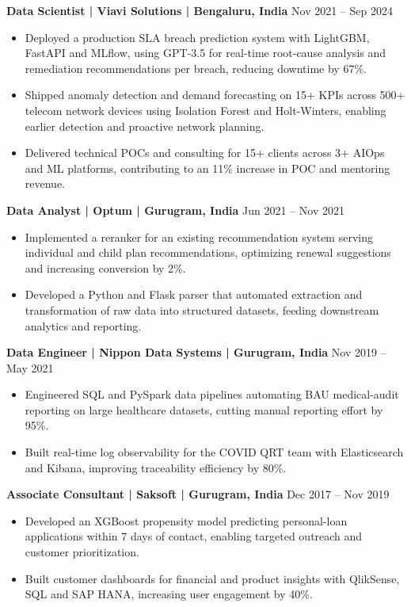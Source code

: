 \documentclass[10pt,a4paper]{article}
\newcommand{\role}[2]{\textbf{#1} \hfill #2\par}
\begin{document}
\role{Data Scientist | Viavi Solutions | Bengaluru, India}{Nov 2021 -- Sep 2024}
\begin{itemize}
  \item Deployed a production SLA breach prediction system with LightGBM, FastAPI and MLflow, using GPT-3.5 for
  real-time root-cause analysis and remediation recommendations per breach, reducing downtime by 67\%.
  \item Shipped anomaly detection and demand forecasting on 15+ KPIs across 500+ telecom network devices using
  Isolation Forest and Holt-Winters, enabling earlier detection and proactive network planning.
  \item Delivered technical POCs and consulting for 15+ clients across 3+ AIOps and ML platforms, contributing to an
  11\% increase in POC and mentoring revenue.
\end{itemize}
\vspace{3pt}

\role{Data Analyst | Optum | Gurugram, India}{Jun 2021 -- Nov 2021}
\begin{itemize}
  \item Implemented a reranker for an existing recommendation system serving individual and child plan
  recommendations, optimizing renewal suggestions and increasing conversion by 2\%.
  \item Developed a Python and Flask parser that automated extraction and transformation of raw data into structured
  datasets, feeding downstream analytics and reporting.
\end{itemize}
\vspace{3pt}

\role{Data Engineer | Nippon Data Systems | Gurugram, India}{Nov 2019 -- May 2021}
\begin{itemize}
  \item Engineered SQL and PySpark data pipelines automating BAU medical-audit reporting on large healthcare datasets,
  cutting manual reporting effort by 95\%.
  \item Built real-time log observability for the COVID QRT team with Elasticsearch and Kibana, improving traceability
  efficiency by 80\%.
\end{itemize}
\vspace{3pt}

\role{Associate Consultant | Saksoft | Gurugram, India}{Dec 2017 -- Nov 2019}
\begin{itemize}
  \item Developed an XGBoost propensity model predicting personal-loan applications within 7 days of contact,
  enabling targeted outreach and customer prioritization.
  \item Built customer dashboards for financial and product insights with QlikSense, SQL and SAP HANA, increasing
  user engagement by 40\%.
\end{itemize}
\end{document}
